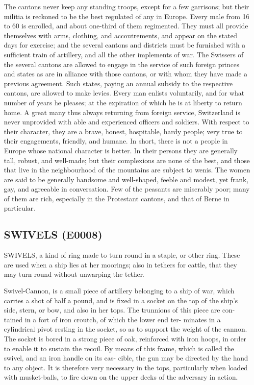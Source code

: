 \documentclass{article}
\begin{document}
The cantons never keep any standing troops, except for a few garrisons; but their militia is reckoned to be the best regulated of any in Europe. Every male from 16 to 60 is enrolled, and about one-third of them regimented. They must all provide themselves with arms, clothing, and accoutrements, and appear on the stated days for exercise; and the several cantons and districts must be furnished with a sufficient train of artillery, and all the other implements of war. The Swissers of the several cantons are allowed to engage in the service of such foreign princes and states as are in alliance with those cantons, or with whom they have made a previous agreement. Such states, paying an annual subsidy to the respective cantons, are allowed to make levies. Every man enlists voluntarily, and for what number of years he pleases; at the expiration of which he is at liberty to return home. A great many thus always returning from foreign service, Switzerland is never unprovided with able and experienced officers and soldiers. With respect to their character, they are a brave, honest, hospitable, hardy people; very true to their engagements, friendly, and humane. In short, there is not a people in Europe whose national character is better. In their persons they are generally tall, robust, and well-made; but their complexions are none of the best, and those that live in the neighbourhood of the mountains are subject to wenis. The women are said to be generally handsome and well-shaped, feeble and modest, yet frank, gay, and agreeable in conversation. Few of the peasants are miserably poor; many of them are rich, especially in the Protestant cantons, and that of Berne in particular.

\subsection*{SWIVELS (E0008)}
SWIVELS, a kind of ring made to turn round in a
staple, or other ring. These are used when a ship lies at
her moorings; also in tethers for cattle, that they may turn
round without unwarping the tether.

Swivel-Cannon, is a small piece of artillery belonging to
a ship of war, which carries a shot of half a pound, and is
fixed in a socket on the top of the ship's side, stern, or bow,
and also in her tops. The trunnions of this piece are con-
tained in a fort of iron croutch, of which the lower end ter-
minates in a cylindrical pivot resting in the socket, so as to
support the weight of the cannon. The socket is bored in
a strong piece of oak, reinforced with iron hoops, in order
to enable it to sustain the recoil. By means of this frame,
which is called the swivel, and an iron handle on its cas-
cible, the gun may be directed by the hand to any object.
It is therefore very necessary in the tops, particularly when
loaded with musket-balls, to fire down on the upper decks
of the adversary in action.
\end{document}
